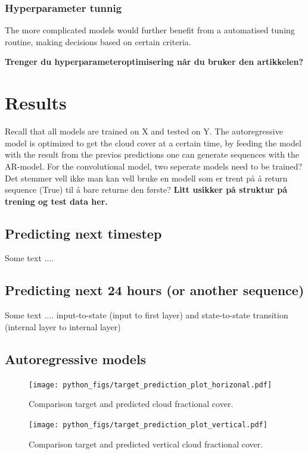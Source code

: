 \subsubsection{Hyperparameter tunnig}  \label{sec:hyperparam_tuning}
The more complicated models would further benefit from a automatised tuning routine, making decisions based on certain criteria.


\textbf{Trenger du hyperparameteroptimisering når du bruker den artikkelen?}

\section{Results}
Recall that all models are trained on X and tested on Y. The autoregressive model is optimized to get the cloud cover at a certain time, by feeding the model with the result from the previos predictions one can generate sequences with the AR-model. For the convolutional model, two seperate models need to be trained? Det stemmer vell ikke man kan vell bruke en modell som er trent på å return sequence (True) til å bare returne den første? \textbf{Litt usikker på struktur på trening og test data her.}
\subsection{Predicting next timestep}
Some text ....

\subsection{Predicting next 24 hours (or another sequence)}
Some text ....
input-to-state (input to first layer) and state-to-state transition (internal layer to internal layer)

\subsection{Autoregressive models}

\begin{figure}[ht]
    \centering
    \texttt{[image: python\_figs/target\_prediction\_plot\_horizonal.pdf]}
    \caption{Comparison target and predicted cloud fractional cover.}
    \label{fig:target_predict_horizontal}
\end{figure}

\begin{figure}[ht]
    \centering
    \texttt{[image: python\_figs/target\_prediction\_plot\_vertical.pdf]}
    \caption{Comparison target and predicted vertical cloud fractional cover.}
    \label{fig:target_predict_vertical}
\end{figure}

